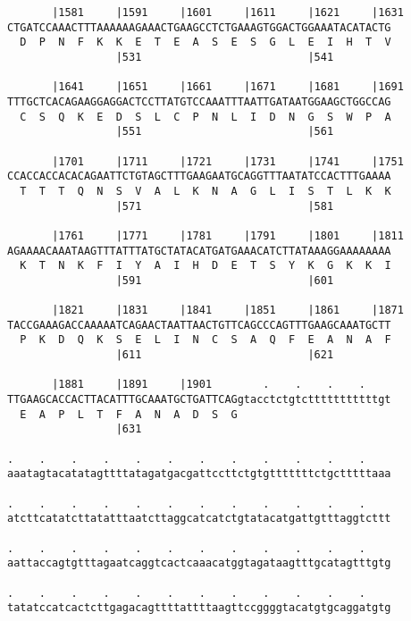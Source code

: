 \documentclass{article}
\begin{document}
\begin{Verbatim}
       |1581     |1591     |1601     |1611     |1621     |1631
CTGATCCAAACTTTAAAAAAGAAACTGAAGCCTCTGAAAGTGGACTGGAAATACATACTG
  D  P  N  F  K  K  E  T  E  A  S  E  S  G  L  E  I  H  T  V
                 |531                          |541         
  
       |1641     |1651     |1661     |1671     |1681     |1691
TTTGCTCACAGAAGGAGGACTCCTTATGTCCAAATTTAATTGATAATGGAAGCTGGCCAG
  C  S  Q  K  E  D  S  L  C  P  N  L  I  D  N  G  S  W  P  A
                 |551                          |561         
  
       |1701     |1711     |1721     |1731     |1741     |1751
CCACCACCACACAGAATTCTGTAGCTTTGAAGAATGCAGGTTTAATATCCACTTTGAAAA
  T  T  T  Q  N  S  V  A  L  K  N  A  G  L  I  S  T  L  K  K
                 |571                          |581         
  
       |1761     |1771     |1781     |1791     |1801     |1811
AGAAAACAAATAAGTTTATTTATGCTATACATGATGAAACATCTTATAAAGGAAAAAAAA
  K  T  N  K  F  I  Y  A  I  H  D  E  T  S  Y  K  G  K  K  I
                 |591                          |601         
  
       |1821     |1831     |1841     |1851     |1861     |1871
TACCGAAAGACCAAAAATCAGAACTAATTAACTGTTCAGCCCAGTTTGAAGCAAATGCTT
  P  K  D  Q  K  S  E  L  I  N  C  S  A  Q  F  E  A  N  A  F
                 |611                          |621         
  
       |1881     |1891     |1901        .    .    .    .    
TTGAAGCACCACTTACATTTGCAAATGCTGATTCAGgtacctctgtctttttttttttgt
  E  A  P  L  T  F  A  N  A  D  S  G                        
                 |631                                       
  
.    .    .    .    .    .    .    .    .    .    .    .    
aaatagtacatatagttttatagatgacgattccttctgtgtttttttctgctttttaaa
                                                            
.    .    .    .    .    .    .    .    .    .    .    .    
atcttcatatcttatatttaatcttaggcatcatctgtatacatgattgtttaggtcttt
                                                            
.    .    .    .    .    .    .    .    .    .    .    .    
aattaccagtgtttagaatcaggtcactcaaacatggtagataagtttgcatagtttgtg
                                                            
.    .    .    .    .    .    .    .    .    .    .    .    
tatatccatcactcttgagacagttttattttaagttccggggtacatgtgcaggatgtg
                                                            

\end{Verbatim}
\end{document}
